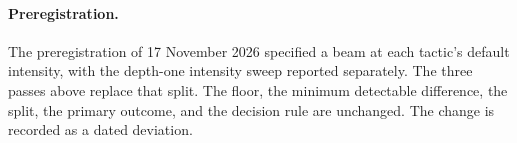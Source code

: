 \paragraph{Preregistration.}
The preregistration of 17 November 2026 specified a beam at each tactic's default intensity, with the depth-one intensity sweep reported separately. The three passes above replace that split. The floor, the minimum detectable difference, the split, the primary outcome, and the decision rule are unchanged. The change is recorded as a dated deviation.
